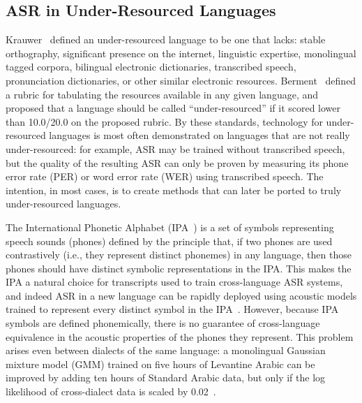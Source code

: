 \subsection{ASR in Under-Resourced Languages}

Krauwer~\cite{Krauwer2003} defined an under-resourced language to be
one that lacks: stable orthography, significant
presence on the internet, linguistic expertise, monolingual tagged
corpora, bilingual electronic dictionaries, transcribed speech,
pronunciation dictionaries, or other similar electronic resources.
Berment~\cite{Berment2004} defined a rubric for tabulating the
resources available in any given language, and proposed that a
language should be called ``under-resourced'' if it scored lower than
10.0/20.0 on the proposed rubric.  By these standards, technology
for under-resourced languages is most often demonstrated on
languages that are not really under-resourced: for example, ASR may be
trained without transcribed speech, but the quality of the resulting
ASR can only be proven by measuring its phone error
rate (PER) or word error rate (WER) using transcribed speech.  The
intention, in most cases, is to create methods that can later be
ported to truly under-resourced languages.

The International Phonetic Alphabet (IPA~\cite{ipa1993}) is a set of
symbols representing speech sounds (phones) defined by the principle
that, if two phones are used contrastively
 (i.e., they represent distinct phonemes) in any language, then
those phones should have distinct symbolic representations in the IPA.
This makes the IPA a natural choice for transcripts used to train
cross-language ASR systems, and indeed ASR in a new language can be 
rapidly deployed using acoustic models trained to represent every 
distinct symbol in the IPA~\cite{Schultz2001}.
However, because IPA symbols are defined phonemically, there is no
guarantee of cross-language equivalence in the acoustic properties of
the phones they represent. This problem arises even between dialects of
the same language: a monolingual Gaussian mixture model (GMM) trained on
five hours of Levantine Arabic can be improved by adding ten hours of
Standard Arabic data, but only if the log likelihood of cross-dialect
data is scaled by 0.02~\cite{Huang2012}.

